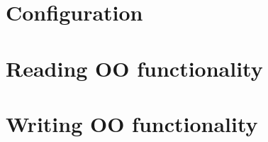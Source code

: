 \documentclass{article}
\begin{document}


\newpage

\section{Configuration}



\newpage

\section{Reading OO functionality}



\newpage

\section{Writing OO functionality}



\newpage
\end{document}

